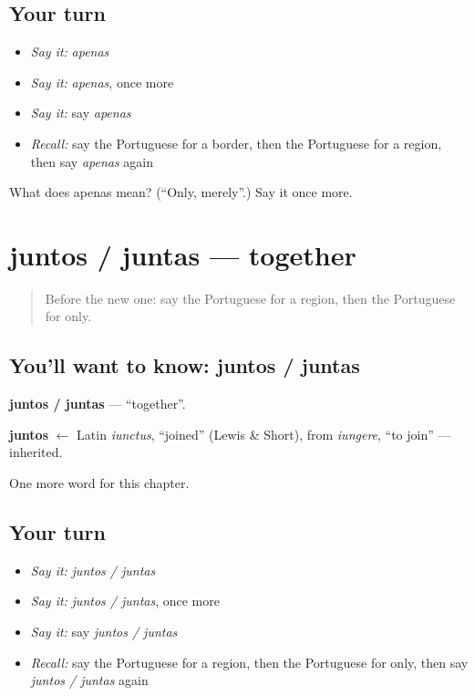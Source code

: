 \subsection*{Your turn}
\begin{itemize}
\raggedright
  \item \emph{Say it:} \emph{apenas}
  \item \emph{Say it:} \emph{apenas}, once more
  \item \emph{Say it:} say \emph{apenas}
  \item \emph{Recall:} say the Portuguese for a border, then the Portuguese for a region, then say \emph{apenas} again
\end{itemize}

\begin{tcolorbox}[breakable,colback=teal!4,colframe=teal!35!black,title={Before you move on}]
What does apenas mean? (\textquotedblleft{}Only, merely\textquotedblright{}.) Say it once more.
\end{tcolorbox}
\section[juntos / juntas]{juntos / juntas — together}

\label{lesson:PT-C214-juntos-juntas}



\begin{quote}
Before the new one: say the Portuguese for a region, then the Portuguese for only.
\end{quote}

\subsection*{You'll want to know: juntos / juntas}
\textbf{juntos / juntas} — \textquotedblleft{}together\textquotedblright{}.

\begin{cousinweb}
\textbf{juntos} $\leftarrow$ Latin \emph{iunctus}, \textquotedblleft{}joined\textquotedblright{} (Lewis \& Short), from \emph{iungere}, \textquotedblleft{}to join\textquotedblright{} — inherited.
\end{cousinweb}

\begin{grammarlens}[title={What you've built}]
One more word for this chapter.
\end{grammarlens}

\subsection*{Your turn}
\begin{itemize}
\raggedright
  \item \emph{Say it:} \emph{juntos / juntas}
  \item \emph{Say it:} \emph{juntos / juntas}, once more
  \item \emph{Say it:} say \emph{juntos / juntas}
  \item \emph{Recall:} say the Portuguese for a region, then the Portuguese for only, then say \emph{juntos / juntas} again
\end{itemize}

